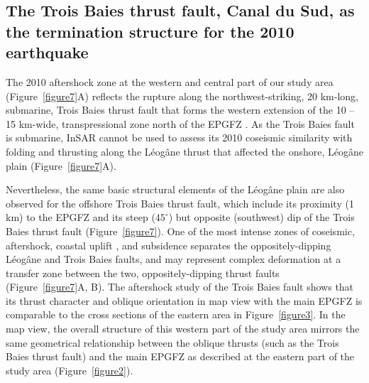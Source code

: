 \documentclass[linenumbers,draft]{agujournal}
\begin{document}
\subsection{The Trois Baies thrust fault, Canal du Sud, as the termination structure for the 2010 earthquake}
The 2010 aftershock zone at the western and central part of our study area (Figure~\ref{figure7}A) reflects the rupture along the northwest-striking, 20 km-long, submarine, Trois Baies thrust fault that forms the western extension of the 10 -- 15 km-wide, transpressional zone north of the EPGFZ \citep{mercier20112010}. As the Trois Baies fault is submarine, InSAR cannot be used to assess its 2010 coseismic similarity with folding and thrusting along the L\'eog\^ane thrust that affected the onshore, L\'eog\^ane plain (Figure~\ref{figure7}A). 

Nevertheless, the same basic structural elements of the L\'eog\^ane plain are also observed for the offshore Trois Baies thrust fault, which include its proximity (1 km) to the EPGFZ and its steep ($45^{\circ}$) but opposite (southwest) dip of the Trois Baies thrust fault (Figure~\ref{figure7}). One of the most intense zones of coseismic, aftershock, coastal uplift \citep{hashimoto2011fan}, and subsidence \citep{prentice2010seismic} separates the oppositely-dipping L\'eog\^ane and Trois Baies faults, and may represent complex deformation at a transfer zone between the two, oppositely-dipping thrust faults (Figure~\ref{figure7}A, B). The aftershock study of the Trois Baies fault \citep{symithe2016present} shows that its thrust character and oblique orientation in map view with the main EPGFZ is comparable to the cross sections of the eastern area in Figure~\ref{figure3}. In the map view, the overall structure of this western part of the study area mirrors the same geometrical relationship between the oblique thrusts (such as the Trois Baies thrust fault) and the main EPGFZ as described at the eastern part of the study area (Figure~\ref{figure2}).
\end{document}
